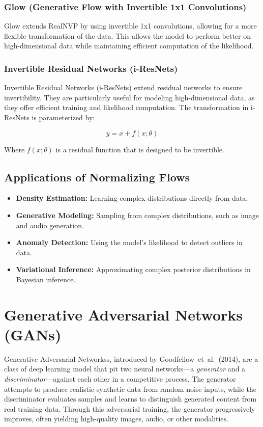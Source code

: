 \documentclass{article}
\begin{document}
\subsubsection{Glow (Generative Flow with Invertible 1x1 Convolutions)}
Glow extends RealNVP by using invertible 1x1 convolutions, allowing for a more flexible transformation of the data. This allows the model to perform better on high-dimensional data while maintaining efficient computation of the likelihood.

\subsubsection{Invertible Residual Networks (i-ResNets)}
Invertible Residual Networks (i-ResNets) extend residual networks to ensure invertibility. They are particularly useful for modeling high-dimensional data, as they offer efficient training and likelihood computation. The transformation in i-ResNets is parameterized by:

\[
y = x + f(x; \theta)
\]

Where \( f(x; \theta) \) is a residual function that is designed to be invertible.

\subsection{Applications of Normalizing Flows}

\begin{itemize}
    \item \textbf{Density Estimation:} Learning complex distributions directly from data.
    \item \textbf{Generative Modeling:} Sampling from complex distributions, such as image and audio generation.
    \item \textbf{Anomaly Detection:} Using the model's likelihood to detect outliers in data.
    \item \textbf{Variational Inference:} Approximating complex posterior distributions in Bayesian inference.
\end{itemize}

\clearpage\newpage

\section{Generative Adversarial Networks (GANs)} \label{sec:gan}

Generative Adversarial Networkss, introduced by Goodfellow et al.\ (2014), are a class of deep learning model that pit two neural networks—a \emph{generator} and a \emph{discriminator}—against each other in a competitive process. The generator attempts to produce realistic synthetic data from random noise inputs, while the discriminator evaluates samples and learns to distinguish generated content from real training data. Through this adversarial training, the generator progressively improves, often yielding high-quality images, audio, or other modalities.
\end{document}
